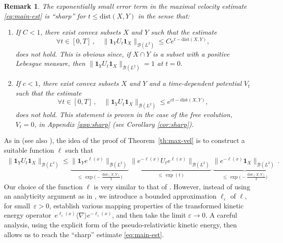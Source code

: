 \documentclass[12pt]{article}
\newcommand{\jnabla}{{\langle\nabla\rangle}}
\newcommand{\dXY}{{\mathrm{dist}(X,Y)}}
\theoremstyle{plain}
\newtheorem{rem}[theo]{Remark}
\begin{document}
\begin{rem}\label{rk:sharp}
 The exponentially small error term in the maximal velocity estimate \eqref{eq:main-est} is ``sharp'' for $t\le\mathrm{dist}(X,Y)$ in the sense that:
\begin{enumerate}
    \item If $C<1$, there exist convex subsets $X$ and $Y$ such that the estimate 
\begin{equation*}
        \forall t\in [0,T]\,,\quad \|\mathbf{1}_Y U_t \mathbf{1}_X\|_{\mathcal{B}(L^2)} \le C e^{t-\dXY},
\end{equation*}
does \emph{not} hold. This is obvious since, if $X\cap Y$ is a subset with a positive Lebesgue measure, then $\|\mathbf{1}_Y U_t \mathbf{1}_X\|_{\mathcal{B}(L^2)}=1$ at $t=0$.
\item If $c<1$, there exist convex subsets $X$ and $Y$ and a time-dependent potential $V_t$ such that the estimate 
\begin{equation*}
        \forall t\in [0,T]\,,\quad \|\mathbf{1}_Y U_t \mathbf{1}_X\|_{\mathcal{B}(L^2)} \le e^{ct-\dXY},
\end{equation*}
does \emph{not} hold. This statement is proven in the case of the free evolution, $V_t=0$, in Appendix \ref{app:sharp} (see Corollary \ref{cor:sharp}).
\end{enumerate}
\end{rem}

As in \cite{SigalWU} (see also \cite{FaupinLemmSigalZhang25}), the idea of the proof of Theorem~\ref{th:max-vel} is to construct a suitable function $\ell$ such that 
\begin{align}
\|\mathbf{1}_Y U_t \mathbf{1}_X\|_{\mathcal{B}(L^2)}
    \le \underset{\le\, \exp\big(-\frac{\dXY}{2}\big)}{\underbrace{\|\mathbf{1}_Ye^{\ell(x)}\|_{\mathcal{B}(L^2)}}} \,
    \underset{\le\, \exp(t)}{\underbrace{\|e^{-\ell(x)}U_te^{\ell(x)}\|_{\mathcal{B}(L^2)}}}\,
    \underset{\le\, \exp\big(-\frac{\dXY}{2}\big)}{\underbrace{\|e^{-\ell(x)}\mathbf{1}_X\|_{\mathcal{B}(L^2)}}}
   \,.\label{eq:idee-borne-de-vitesse-maximale}
\end{align}
Our choice of the function $\ell$ is very similar to that of \cite{SigalWU,FaupinLemmSigalZhang25}. However, instead of using an analyticity argument as in \cite{SigalWU}, we introduce a bounded approximation $\ell_\varepsilon$ of $\ell$, for small~$\varepsilon>0$, establish various mapping properties of the transformed kinetic energy operator~$e^{\ell_\varepsilon(x)}\jnabla e^{-\ell_\varepsilon(x)}$, and then take the limit $\varepsilon\to0$. A careful analysis, using the explicit form of the pseudo-relativistic kinetic energy, then allows us to reach the ``sharp'' estimate \eqref{eq:main-est}.
\end{document}
